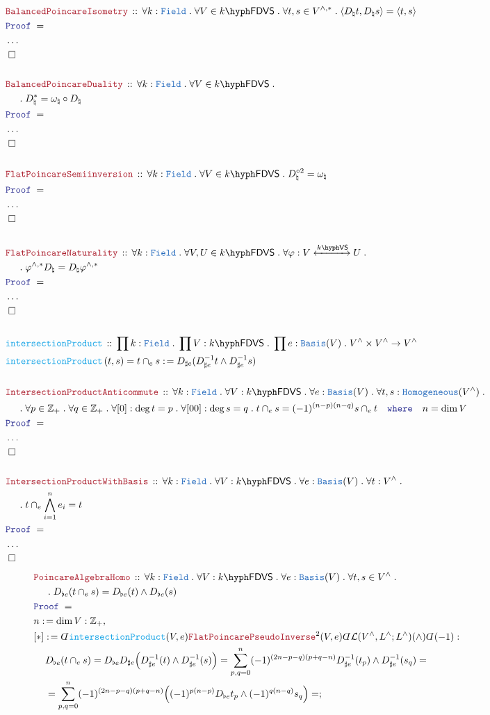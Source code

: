 \documentclass[12pt]{scrartcl}%
\newcommand{\TYPE}[1]{\textcolor{NavyBlue}{\mathtt{#1}}}%
\newcommand{\FUNC}[1]{\textcolor{Cerulean}{\mathtt{#1}}}%
\newcommand{\LOGIC}[1]{\textcolor{Blue}{\mathtt{#1}}}%
\newcommand{\THM}[1]{\textcolor{Maroon}{\mathtt{#1}}}%
\renewcommand{\.}{\; . \;} %
\newcommand{\de}{: \kern 0.1pc =} %
\newcommand{\where}{\LOGIC{where}} %
\newcommand{\Act}[1]{\left( #1 \right)} %
\newcommand{\Theorem}[2]{& \THM{#1} \, :: \, #2 \\ & \Proof = \\ } %
\newcommand{\DeclareFunc}[2]{& \FUNC{#1} \, :: \, #2 \\}%
\newcommand{\DefineNamedFunc}[4]{&  \FUNC{#1}\Act{#2} = #3 \de #4 \\}%
\newcommand{\NewLine}{\\ & \kern 1pc}%
\newcommand{\Page}[1]{ \begin{align*} #1 \end{align*}  }%
\newcommand{ \bd }{ \ByDef }%
\newcommand{\NoProof}{ & \ldots \\ \EndProof}%
\newcommand{\Int}{\mathbb{Z}}%
\newcommand{\Say}[3]{& #1 \de #2 : #3, \\} %
\newcommand{\Conclude}[3]{& #1 \de #2 : #3; \\}%
\newcommand{\QED}{\; \square} %
\newcommand{\EndProof}{& \QED \\} %
\newcommand{\ByDef}{\rotatebox[origin=c]{-180}{$D$}}%
\newcommand{\Proof}{\LOGIC{Proof} \; } %
\newcommand{\ToIso}[1]{\xleftrightarrow{#1}}%
\newcommand{\Basis}{\TYPE{Basis}} %
\newcommand{\VS}[1]{#1\hyph\mathsf{VS}} %
\newcommand{\FDVS}[1]{#1\hyph\mathsf{FDVS}} %
\renewcommand{\L}{\mathcal{L}}
\newcommand{\Field}{\TYPE{Field}}
\begin{document}
\Page{
	\Theorem{BalancedPoincareIsometry}{
		\forall k : \Field \. 
		\forall V \in \FDVS{k} \.
		\forall t,s \in V^{\wedge,*} \. 
		\langle D_\natural t, D_\natural s  \rangle = \langle t, s \rangle
	}
	\NoProof
	\\
	\Theorem{BalancedPoincareDuality}{
		\forall k : \Field \.
		\forall V \in \FDVS{k} \.
		 \NewLine \.
		D^*_{\natural} = \omega_\natural \circ D_{\natural}
	}
	\NoProof
	\\
	\Theorem{FlatPoincareSemiinversion}{
		\forall k : \Field \.
		\forall V \in \FDVS{k} \.
		D_\natural^{\circ 2} = \omega_\natural  }
	\NoProof
	\\
	\Theorem{FlatPoincareNaturality}{
		\forall k : \Field \.
		\forall V,U \in \FDVS{k} \.
		\forall \varphi : V \ToIso{\VS{k}} U \. \NewLine \. 
		\varphi^{\wedge,*} D_{\natural} = D_{\natural} \varphi^{\wedge,*}  	
	}
	\NoProof
	\\
	\DeclareFunc{intersectionProduct}{ \prod k : \Field \. \prod V : \FDVS{k} \. \prod e : \Basis(V)  \. V^{\wedge} \times V^{\wedge} \to V^{\wedge} }
	\DefineNamedFunc{intersectionProduct}{ t,s}{t \cap_e s}{ D_{\sharp e}(D_{\sharp e}^{-1} t \wedge D_{\sharp e}^{-1} s )}
	\\
	\Theorem{IntersectionProductAnticommute}
	{
		\forall k : \Field \. 
		\forall V : \FDVS{k} \. 
		\forall e : \Basis(V) \.
		\forall t,s : \TYPE{Homogeneous}(V^{\wedge}) \. \NewLine \. 
		\forall p \in \Int_+ \. 
		\forall q \in \Int_+ \. 
		\forall [0] : \deg t = p \.
		\forall [00] : \deg s = q \.
		 t \cap_e s = (-1)^{(n-p)(n-q)}s \cap_e t
		\quad \where \quad
		n = \dim V 
	}
	\NoProof
	\\
	\Theorem{IntersectionProductWithBasis}
	{
		\forall k : \Field \. 
		\forall V : \FDVS{k} \. 
		\forall e : \Basis(V) \.
		\forall t : V^{\wedge} \. \NewLine \. 
		t \cap_e \bigwedge^n_{i=1} e_i = t
	}
	\NoProof
}\Page{
	\Theorem{PoincareAlgebraHomo}
	{
		\forall k : \Field \.
		\forall V : \FDVS{k} \.
		\forall e : \Basis(V) \.
		\forall t,s \in V^{\wedge} \. \NewLine \. 
		D_{\flat e}(t \cap_e s) = D_{\flat e}(t) \wedge D_{\flat e}(s) 
	}
	\Say{n}{\dim V}{\Int_+}
	\Conclude{[*]}{\bd \FUNC{intersectionProduct}(V,e) \THM{FlatPoincarePseudoInverse}^2(V,e) \bd \L(V^\wedge,L^\wedge;L^\wedge)(\wedge) \bd(-1)}{
		\NewLine
		D_{\flat e}( t \cap_e s) = 
		D_{\flat e} D_{\sharp e} \Big(D_{\sharp e}^{-1}(t) \wedge D_{\sharp e}^{-1}(s) \Big) =
		\sum^n_{p,q= 0} (-1)^{(2n - p - q)(p + q - n)} D_{\sharp e}^{-1}(t_p) \wedge D_{\sharp e}^{-1}(s_q) = \NewLine = 
		\sum^n_{p,q = 0}(-1)^{(2n-p-q)(p+q-n)} \Big( (-1)^{p(n- p)} D_{\flat e}t_p \wedge (-1)^{q(n - q)}s_q\Big) =  
}}
\end{document}
